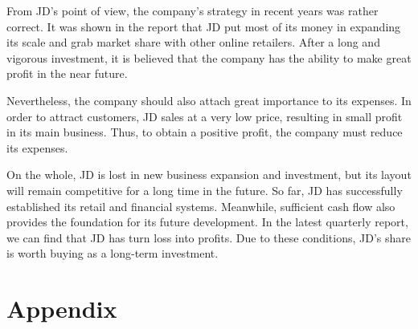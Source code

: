 From JD’s point of view, the company’s strategy in recent years was rather correct. It was shown in the report that JD put most of its money in expanding its scale and grab market share with other online retailers. After a long and vigorous investment, it is believed that the company has the ability to make great profit in the near future.

Nevertheless, the company should also attach great importance to its expenses. In order to attract customers, JD sales at a very low price, resulting in small profit in its main business. Thus, to obtain a positive profit, the company must reduce its expenses.

On the whole, JD is lost in new business expansion and investment, but its layout will remain competitive for a long time in the future. So far, JD has successfully established its retail and financial systems. Meanwhile, sufficient cash flow also provides the foundation for its future development. In the latest quarterly report, we can find that JD has turn loss into profits. Due to these conditions, JD’s share is worth buying as a long-term investment.

\newpage
\section*{Appendix}

 
\newpage


%
%
%



